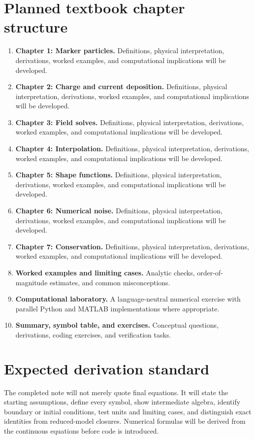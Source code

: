 \documentclass[11pt]{article}
\begin{document}
\section{Planned textbook chapter structure}
\begin{enumerate}[leftmargin=1.8em]
\item \textbf{Chapter 1: Marker particles.} Definitions, physical interpretation, derivations, worked examples, and computational implications will be developed.
\item \textbf{Chapter 2: Charge and current deposition.} Definitions, physical interpretation, derivations, worked examples, and computational implications will be developed.
\item \textbf{Chapter 3: Field solves.} Definitions, physical interpretation, derivations, worked examples, and computational implications will be developed.
\item \textbf{Chapter 4: Interpolation.} Definitions, physical interpretation, derivations, worked examples, and computational implications will be developed.
\item \textbf{Chapter 5: Shape functions.} Definitions, physical interpretation, derivations, worked examples, and computational implications will be developed.
\item \textbf{Chapter 6: Numerical noise.} Definitions, physical interpretation, derivations, worked examples, and computational implications will be developed.
\item \textbf{Chapter 7: Conservation.} Definitions, physical interpretation, derivations, worked examples, and computational implications will be developed.
\item \textbf{Worked examples and limiting cases.} Analytic checks, order-of-magnitude estimates, and common misconceptions.
\item \textbf{Computational laboratory.} A language-neutral numerical exercise with parallel Python and MATLAB implementations where appropriate.
\item \textbf{Summary, symbol table, and exercises.} Conceptual questions, derivations, coding exercises, and verification tasks.
\end{enumerate}

\section{Expected derivation standard}
The completed note will not merely quote final equations. It will state the starting assumptions, define every symbol, show intermediate algebra, identify boundary or initial conditions, test units and limiting cases, and distinguish exact identities from reduced-model closures. Numerical formulas will be derived from the continuous equations before code is introduced.
\end{document}
